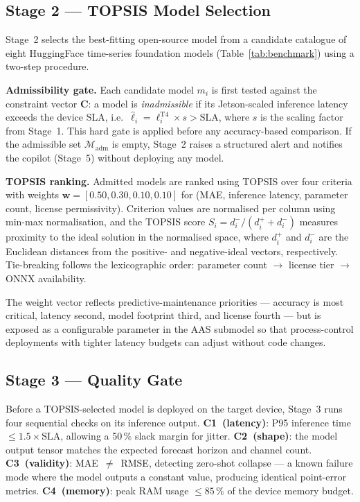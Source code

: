 \documentclass[12pt,a4paper]{article}
\begin{document}
\subsection{Stage 2 — TOPSIS Model Selection}
\label{subsec:s2}

Stage~2 selects the best-fitting open-source model from a candidate
catalogue of eight HuggingFace time-series foundation models
(Table~\ref{tab:benchmark}) using a two-step procedure.

\textbf{Admissibility gate.}
Each candidate model $m_i$ is first tested against the constraint
vector $\mathbf{C}$: a model is \emph{inadmissible} if its
Jetson-scaled inference latency exceeds the device SLA,
i.e.\ $\hat{\ell}_i = \ell_i^{\text{T4}} \times s > \text{SLA}$,
where $s$ is the scaling factor from Stage~1.
This hard gate is applied before any accuracy-based comparison.
If the admissible set $\mathcal{M}_\text{adm}$ is empty, Stage~2
raises a structured alert and notifies the copilot (Stage~5)
without deploying any model.

\textbf{TOPSIS ranking.}
Admitted models are ranked using TOPSIS over four criteria with
weights $\mathbf{w} = [0.50, 0.30, 0.10, 0.10]$ for
(MAE, inference latency, parameter count, license permissivity).
Criterion values are normalised per column using min-max
normalisation, and the TOPSIS score
$S_i = d_i^- / (d_i^+ + d_i^-)$
measures proximity to the ideal solution in the normalised space,
where $d_i^+$ and $d_i^-$ are the Euclidean distances from the
positive- and negative-ideal vectors, respectively.
Tie-breaking follows the lexicographic order:
parameter count $\to$ license tier $\to$ ONNX availability.

The weight vector reflects predictive-maintenance priorities ---
accuracy is most critical, latency second, model footprint third,
and license fourth --- but is exposed as a configurable parameter
in the AAS submodel so that process-control deployments with
tighter latency budgets can adjust without code changes.

\subsection{Stage 3 — Quality Gate}
\label{subsec:s3}

Before a TOPSIS-selected model is deployed on the target device,
Stage~3 runs four sequential checks on its inference output.
\textbf{C1~(latency)}: P95 inference time $\leq 1.5 \times \text{SLA}$,
allowing a 50\,\% slack margin for jitter.
\textbf{C2~(shape)}: the model output tensor matches the expected
forecast horizon and channel count.
\textbf{C3~(validity)}: MAE~$\neq$~RMSE, detecting zero-shot collapse
--- a known failure mode where the model outputs a constant value,
producing identical point-error metrics.
\textbf{C4~(memory)}: peak RAM usage $\leq 85\,\%$ of the device
memory budget.
\end{document}
